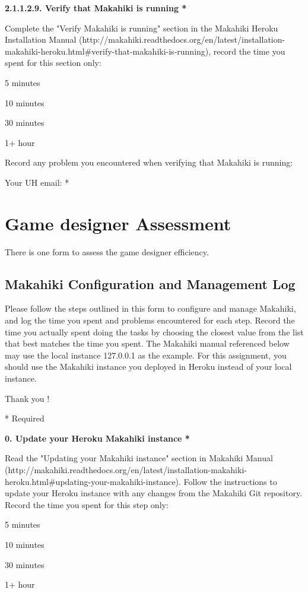 {\bf 2.1.1.2.9. Verify that Makahiki is running *}

Complete the "Verify Makahiki is running" section in the Makahiki Heroku Installation Manual (http://makahiki.readthedocs.org/en/latest/installation-makahiki-heroku.html\#verify-that-makahiki-is-running), record the time you spent for this section only:

\begin{compactitem}
\item 5 minutes
\item  10 minutes
\item  30 minutes
\item  1+ hour
\end{compactitem}

Record any problem you encountered when verifying that Makahiki is running:

Your UH email: *

\section{Game designer Assessment}
There is one form to assess the game designer efficiency.

\subsection{Makahiki Configuration and Management Log}

Please follow the steps outlined in this form to configure and manage Makahiki, and log the time you spent and problems encountered for each step. Record the time you actually spent doing the tasks by choosing the closest value from the list that best matches the time you spent.
The Makahiki manual referenced below may use the local instance 127.0.0.1 as the example. For this assignment, you should use the Makahiki instance you deployed in Heroku instead of your local instance.

Thank you !

* Required

{\bf 0. Update your Heroku Makahiki instance *}

Read the "Updating your Makahiki instance" section in Makahiki Manual (http://makahiki.readthedocs.org/en/latest/installation-makahiki-heroku.html\#updating-your-makahiki-instance). Follow the instructions to update your Heroku instance with any changes from the Makahiki Git repository. Record the time you spent for this step only:

\begin{compactitem}
\item 5 minutes
\item  10 minutes
\item  30 minutes
\item  1+ hour
\end{compactitem}

